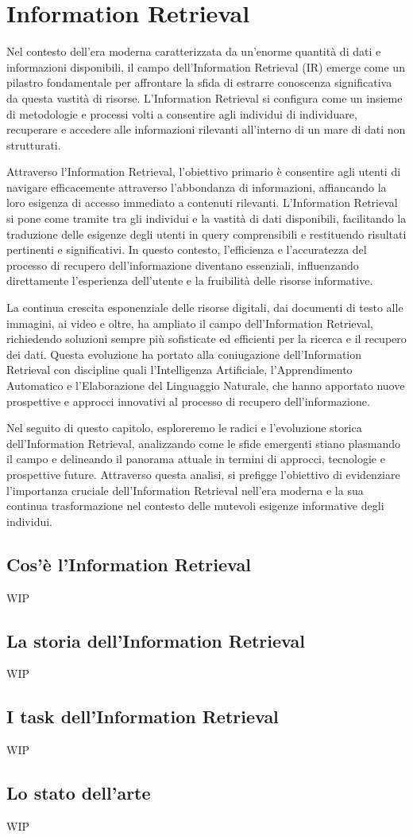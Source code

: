 \chapter{Information Retrieval}\label{Information_Retrieval}
Nel contesto dell'era moderna caratterizzata da un'enorme quantità di dati e informazioni disponibili, il campo dell'Information Retrieval (IR) emerge come un pilastro fondamentale per affrontare la sfida di estrarre conoscenza significativa da questa vastità di risorse. L'Information Retrieval si configura come un insieme di metodologie e processi volti a consentire agli individui di individuare, recuperare e accedere alle informazioni rilevanti all'interno di un mare di dati non strutturati.

Attraverso l'Information Retrieval, l'obiettivo primario è consentire agli utenti di navigare efficacemente attraverso l'abbondanza di informazioni, affiancando la loro esigenza di accesso immediato a contenuti rilevanti. L'Information Retrieval si pone come tramite tra gli individui e la vastità di dati disponibili, facilitando la traduzione delle esigenze degli utenti in query comprensibili e restituendo risultati pertinenti e significativi. In questo contesto, l'efficienza e l'accuratezza del processo di recupero dell'informazione diventano essenziali, influenzando direttamente l'esperienza dell'utente e la fruibilità delle risorse informative.

La continua crescita esponenziale delle risorse digitali, dai documenti di testo alle immagini, ai video e oltre, ha ampliato il campo dell'Information Retrieval, richiedendo soluzioni sempre più sofisticate ed efficienti per la ricerca e il recupero dei dati. Questa evoluzione ha portato alla coniugazione dell'Information Retrieval con discipline quali l'Intelligenza Artificiale, l'Apprendimento Automatico e l'Elaborazione del Linguaggio Naturale, che hanno apportato nuove prospettive e approcci innovativi al processo di recupero dell'informazione.

Nel seguito di questo capitolo, esploreremo le radici e l'evoluzione storica dell'Information Retrieval, analizzando come le sfide emergenti stiano plasmando il campo e delineando il panorama attuale in termini di approcci, tecnologie e prospettive future. Attraverso questa analisi, si prefigge l'obiettivo di evidenziare l'importanza cruciale dell'Information Retrieval nell'era moderna e la sua continua trasformazione nel contesto delle mutevoli esigenze informative degli individui.\section{Cos'è l'Information Retrieval} WIP

\section{La storia dell'Information Retrieval} WIP
 
\section{I task dell'Information Retrieval} WIP

\section{Lo stato dell'arte} WIP
